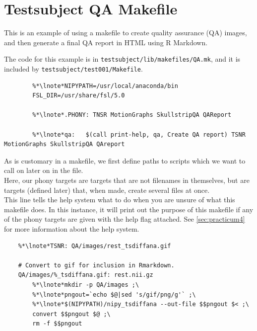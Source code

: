 \section{Testsubject QA Makefile}
\label{example:testsubjectQA}

This is an example of using a makefile to create quality assurance (QA) images, and then generate a final QA report in HTML using R Markdown. 

The code for this example is in \texttt{testsubject/lib/makefiles/QA.mk}, and it is included by \texttt{testsubject/test001/Makefile}.

\setcounter{codehighlight}{0} %
\begin{lstlisting}
		%*\lnote*NIPYPATH=/usr/local/anaconda/bin
		FSL_DIR=/usr/share/fsl/5.0

		%*\lnote*.PHONY: TNSR MotionGraphs SkullstripQA QAReport

		%*\lnote*qa:   $(call print-help, qa, Create QA report) TSNR MotionGraphs SkullstripQA QAreport
\end{lstlisting}

\noindent{} As is customary in a makefile, we first define paths to scripts which we want to call on later on in the file. \\
 Here, our phony targets are targets that are not filenames in themselves, but are targets (defined later) that, when made, create several files at once. \\
 This line tells the \maken{} help system what to do when you are unsure of what this makefile does. In this instance, it will print out the purpose of this makefile if any of the phony targets are given with the help flag attached. See \autoref{sec:practicum4} for more information about the help system. \\

\begin{lstlisting}
	%*\lnote*TSNR: QA/images/rest_tsdiffana.gif

	# Convert to gif for inclusion in Rmarkdown. 
	QA/images/%_tsdiffana.gif: rest.nii.gz
		%*\lnote*mkdir -p QA/images ;\
		%*\lnote*pngout=`echo $@|sed 's/gif/png/g'` ;\
		%*\lnote*$(NIPYPATH)/nipy_tsdiffana --out-file $$pngout $< ;\
		convert $$pngout $@ ;\
		rm -f $$pngout
\end{lstlisting}

